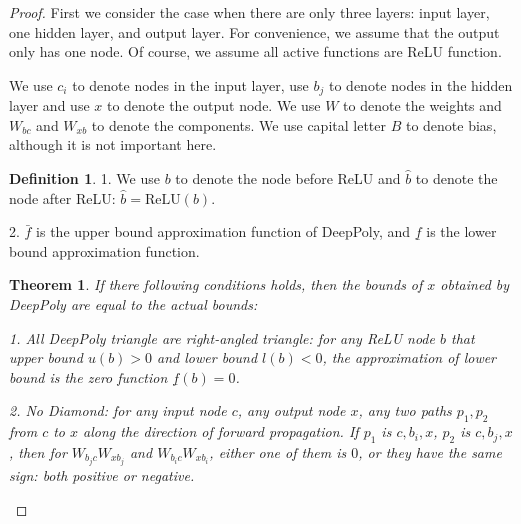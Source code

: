 \documentclass[]{article}
\newtheorem{theorem}{Theorem}
\theoremstyle{definition}
\newtheorem{definition}{Definition}
\newcommand{\ReLU}{\mathrm{ReLU}}
\begin{document}
\begin{proof}
First we consider the case when there are only three layers: input layer, one hidden layer, and output layer. For convenience, we assume that the output only has one node. Of course, we assume all active functions are ReLU function.

We use $c_i$ to denote nodes in the input layer, use $b_j$ to denote nodes in the hidden layer and use $x$ to denote the output node. We use $W$ to denote the weights and $W_{bc}$ and $W_{xb}$ to denote the components. We use capital letter $B$ to denote bias, although it is not important here.



\begin{definition}
	1. We use $b$ to denote the node before ReLU and $\hat{b}$ to denote the node after ReLU: $\hat{b} = \ReLU(b)$.
	
	2. $\bar{f}$ is the upper bound approximation function of DeepPoly, and $\underline{f}$ is the lower bound approximation function.
\end{definition}



\begin{theorem}
	If there following conditions holds, then the bounds of $x$ obtained by DeepPoly are equal to the actual bounds:
	
	1. All DeepPoly triangle are right-angled triangle: for any ReLU node $b$ that upper bound $u(b)>0$ and lower bound $l(b)<0$, the approximation of lower bound is the zero function $\underline{f}(b)=0$.
	
	2. No Diamond: for any input node $c$, any output node $x$, any two paths $p_1,p_2$ from $c$ to $x$ along the direction of forward propagation. If $p_1$ is $c,b_i,x$, $p_2$ is $c,b_j,x$, then for $W_{b_jc}W_{xb_j}$ and $W_{b_ic}W_{xb_i}$, either one of them is $0$, or they have the same sign: both positive or negative.
\end{theorem}



\end{proof}
\end{document}
